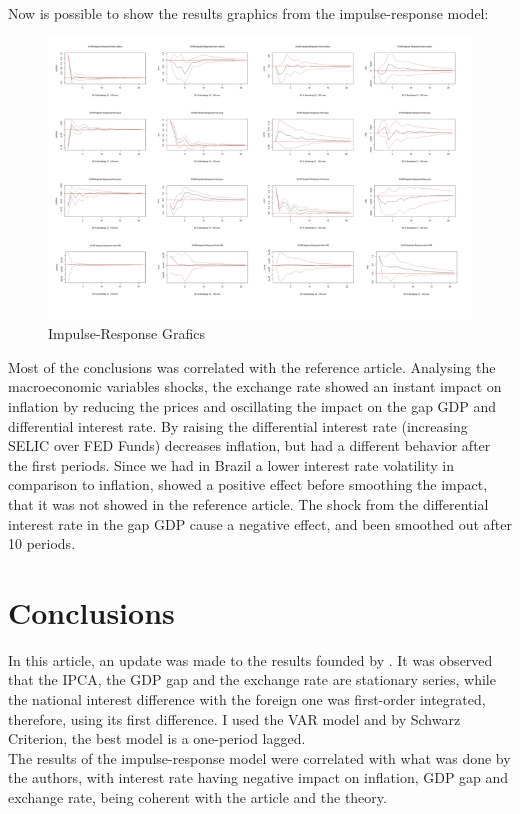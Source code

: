 \documentclass[hidelinks,12pt]{article}
\begin{document}
Now is possible to show the results graphics from the impulse-response model:

\begin{figure}[H]
	\centering
	\includegraphics[width=0.7\linewidth]{irf}
	\caption{Impulse-Response Grafics}
	\label{fig:irf}
\end{figure}

Most of the conclusions was correlated with the reference article. Analysing the macroeconomic variables shocks, the exchange rate showed an instant impact on inflation by reducing the prices and oscillating the impact on the gap GDP and differential interest rate. By raising the differential interest rate (increasing SELIC over FED Funds) decreases inflation, but had a different behavior after the first periods. Since we had in Brazil a lower interest rate volatility in comparison to inflation, showed a positive effect before smoothing the impact, that it was not showed in the reference article. The shock from the differential interest rate in the gap GDP cause a negative effect, and been smoothed out after 10 periods. 
	
	\section{Conclusions}

In this article, an update was made to the results founded by \citet{c15}. It was observed that the IPCA, the GDP gap and the exchange rate are stationary series, while the national interest difference with the foreign one was first-order integrated, therefore, using its first difference. I used the VAR model and by Schwarz Criterion, the best model is a one-period lagged.\\

 The results of the impulse-response model were correlated with what was done by the authors, with interest rate having negative impact on inflation, GDP gap and exchange rate, being coherent with the article and the theory.





	
	

\clearpage










	
\end{document}
